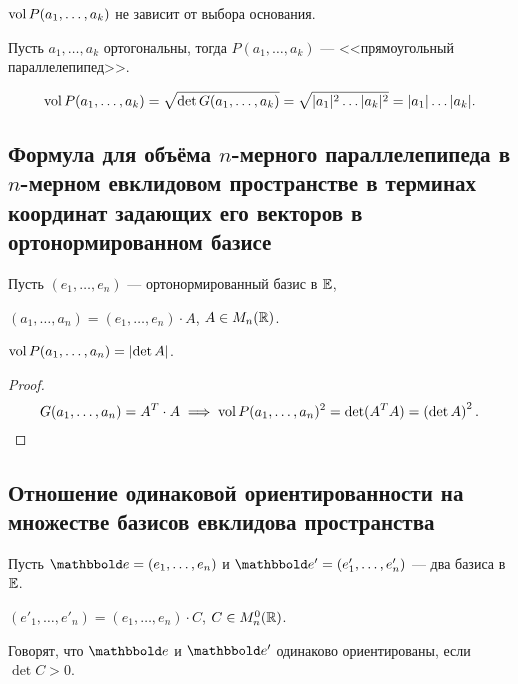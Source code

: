 \begin{corollary}
    $\operatorname{\mathop{\mathrm{vol}}} P(a_1, \dots, a_k)$ не зависит от выбора основания.
\end{corollary}

\begin{example}
    Пусть $a_1, \dots, a_k$ ортогональны, тогда $P(a_1, \dots, a_k)$ --- <<прямоугольный параллелепипед>>.

    \begin{equation*}
        \operatorname{\mathop{\mathrm{vol}}} P(a_1, \dots, a_k) = \sqrt{\det G(a_1, \dots, a_k)} = \sqrt{|a_1|^2 \dots |a_k|^2} = |a_1| \dots |a_k|
    .\end{equation*}
\end{example}


\subsection{Формула для объёма $n$-мерного параллелепипеда в $n$-мерном евклидовом пространстве в терминах координат задающих его векторов в ортонормированном базисе}

Пусть $(e_1, \dots, e_n)$ --- ортонормированный базис в $\mathbb{E}$,

$(a_1, \dots, a_n) = (e_1, \dots, e_n) \cdot A$, $A \in M_n(\mathbb{R})$.

\begin{proposal}
    $\operatorname{\mathop{\mathrm{vol}}} P(a_1, \dots, a_n) = \left|\det A\right|$.
\end{proposal}

\begin{proof}
    \begin{equation*}
        G(a_1, \dots, a_n) = A^{T} \cdot A \implies \operatorname{\mathop{\mathrm{vol}}} P(a_1, \dots, a_n)^2 = \det (A^{T} A) = \left(\det A\right)^2
        \qedhere
    .\end{equation*}
\end{proof}


\subsection{Отношение одинаковой ориентированности на множестве базисов евклидова пространства}

Пусть $\E = (e_1, \dots, e_n)$ и $\E' = (e'_1, \dots, e'_n)$ --- два базиса в $\mathbb{E}$.

$(e'_1, \dots, e'_n) = (e_1, \dots, e_n) \cdot C$, $C \in M_n^0(\mathbb{R})$.

\begin{definition}
    Говорят, что $\E$ и $\E'$ одинаково ориентированы, если $\det C > 0$.
\end{definition}

